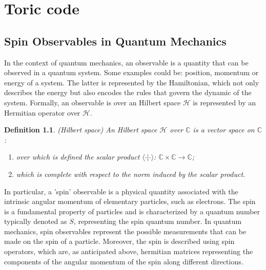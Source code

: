 \documentclass{Configuration_Files/PoliMi3i_thesis}
\newtheorem{definition}{Definition}[chapter]
\begin{document}
\chapter{Toric code}
\label{ch:chapter_one}%


\section{Spin Observables in Quantum Mechanics}
\label{sec:Observables}

In the context of quantum mechanics, an observable is a quantity that can be observed in a quantum system. Some examples could be: position, momentum or energy of a system. The latter is represented by the Hamiltonian, which not only describes the energy but also encodes the rules that govern the dynamic of the system. 
Formally, an observable is over an Hilbert space $\mathscr{H}$ is represented by an Hermitian operator over $\mathscr{H}$.

\begin{definition} (Hilbert space)
	An Hilbert space $\mathscr{H}$ over $\mathbb{C}$ is a vector space on $\mathbb{C}$:  
	\begin{enumerate}
		\item over which is defined the scalar product $\langle \cdot \vert \cdot \rangle $: $\mathbb{C} \times \mathbb{C} \rightarrow \mathbb{C}$;
		\item which is complete with respect to the norm induced by the scalar product.
	\end{enumerate}
\end{definition}

In particular, a 'spin' observable is a physical quantity associated with the intrinsic angular momentum of elementary particles, such as electrons. The spin is a fundamental property of particles and is characterized by a quantum number typically denoted as $S$, representing the spin quantum number.
In quantum mechanics, spin observables represent the possible measurements that can be made on the spin of a particle. Moreover, the spin is described using spin operators, which are, as anticipated above, hermitian matrices representing the components of the angular momentum of the spin along different directions. 
\end{document}
